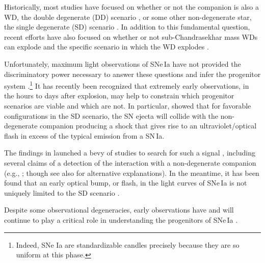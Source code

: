 \documentclass[twocolumn]{aastex63}
\begin{document}
Historically, most studies have focused on whether or not the companion is
also a WD, the double degenerate (DD) scenario \citep[e.g.,][]{Webbink84}, or
some other non-degenerate star, the single degenerate (SD) scenario
\citep[e.g.,][]{Whelan73}. In addition to this fundamental question, recent
efforts have also focused on whether or not sub-Chandrasekhar mass WDs can
explode \citep[e.g.,][]{Fink10,Shen14,Scalzo14a,Polin19} and the specific
scenario in which the WD explodes \citep[see][and references
therein]{Hillebrandt13,Ropke18}.

Unfortunately, maximum light observations of SNe\,Ia have not provided the
discriminatory power necessary to answer these questions and infer the
progenitor system \citep[e.g.,][]{Ropke12}.\footnote{Indeed, SNe Ia are
standardizable candles precisely because they are so uniform at this phase.}
It has recently been recognized that extremely early observations, in the
hours to days after explosion, may help to constrain which progenitor
scenarios are viable and which are not. In particular, \citet{Kasen10a} showed
that for favorable configurations in the SD scenario, the SN ejecta will
collide with the non-degenerate companion producing a shock that gives rise to
an ultraviolet/optical flash in excess of the typical emission from a SN\,Ia.

The findings in \citet{Kasen10a} launched a bevy of studies to search for such
a signal \citep[e.g.,][]{Hayden10,Ganeshalingam11,Bianco11,Nugent11,Olling15},
including several claims of a detection of the interaction with a
non-degenerate companion (e.g.,
\citealt{Cao15,Marion16,Hosseinzadeh17,Dimitriadis19}; though see also
\citealt{Kromer16,Shappee18,Shappee19,Jiang18} for alternative explanations).
In the meantime, it has been found that an early optical bump, or flash, in
the light curves of SNe\,Ia is not uniquely limited to the SD scenario
\citep[e.g.,][]{Raskin13,Piro16,Levanon17,Noebauer17,Jiang17,Maeda18,Polin19,
De19,Magee20a}.

Despite some observational degeneracies, early observations have and will
continue to play a critical role in understanding the progenitors of SNe\,Ia
\citep[e.g., early photometry of SN\,2011fe constrained the size of the
exploding star to be $\lesssim 0.02$\,$R_\odot$, providing the most direct
evidence to date that SNe\,Ia come from WDs;][]{Bloom12a}.
\end{document}
